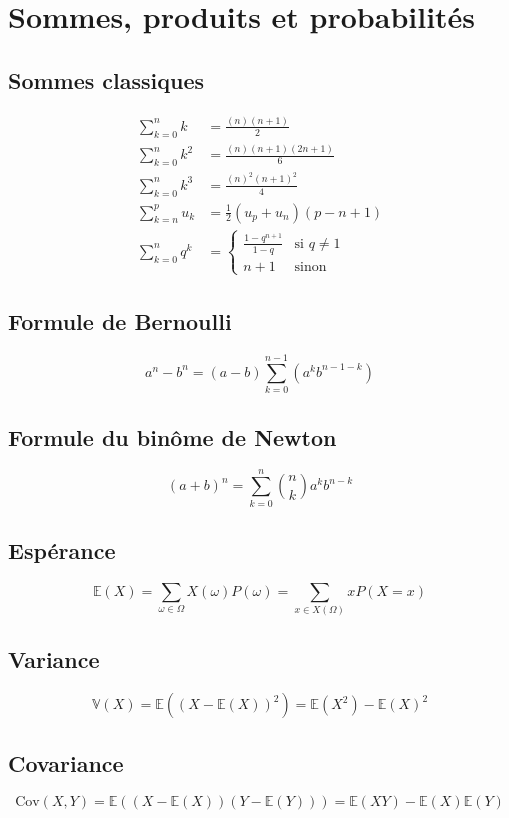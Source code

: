 \documentclass[]{article}
\begin{document}
\section{Sommes, produits et probabilités}
\subsection*{Sommes classiques}

\begin{align*}
    \sum_{k=0}^{n}k &= \frac{(n)(n+1)}{2} \\
    \sum_{k=0}^{n}k^2 &= \frac{(n)(n+1)(2n+1)}{6} \\
    \sum_{k=0}^{n}k^3 &= \frac{(n)^2(n+1)^2}{4} \\
    \sum_{k=n}^{p}u_k &= \frac{1}{2}(u_p+u_n)(p-n+1) \\
    \sum_{k=0}^n q^k &= 
        \begin{cases}
            \frac{1-q^{n+1}}{1-q} & \text{si } q \neq 1 \\
            n+1 & \text{sinon}
        \end{cases}
\end{align*}

\subsection*{Formule de Bernoulli}
\[a^n - b^n = (a-b)\sum_{k=0}^{n-1}(a^kb^{n-1-k}) \]

\subsection*{Formule du binôme de Newton}
\[ (a+b)^n = \sum_{k=0}^{n}\binom{n}{k} a^kb^{n-k} \]

\subsection*{Espérance}
\[ \mathbb{E}(X) = \sum_{\omega \in \Omega} X(\omega)P({\omega}) = \sum_{x \in X(\Omega)} xP(X=x) \]

\subsection*{Variance}
\[ \mathbb{V}(X) = \mathbb{E}((X-\mathbb{E}(X))^2) = \mathbb{E}(X^2) - \mathbb{E}(X)^2 \]

\subsection*{Covariance}
\[ \text{Cov}(X,Y) = \mathbb{E}((X-\mathbb{E}(X))(Y-\mathbb{E}(Y))) = \mathbb{E}(XY) - \mathbb{E}(X)\mathbb{E}(Y) \]
\end{document}
